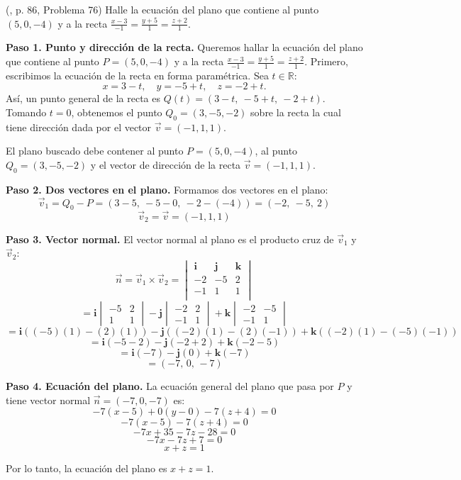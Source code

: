 \begin{prob} (\cite{espinoza2006Algebralineal}, p. 86, Problema 76) Halle la ecuación del plano que contiene al punto $(5,0,-4)$ y a la recta $\frac{x-3}{-1}=\frac{y+5}{1}=\frac{z+2}{1}$. 
\begin{myproof}
\textbf{Paso 1. Punto y dirección de la recta.} Queremos hallar la ecuación del plano que contiene al punto $P = (5,0,-4)$ y a la recta \(\frac{x-3}{-1} = \frac{y+5}{1} = \frac{z+2}{1}.\)
Primero, escribimos la ecuación de la recta en forma paramétrica. Sea $t \in \mathbb{R}$:
\[
x = 3 - t, \quad y = -5 + t, \quad z = -2 + t.
\]
Así, un punto general de la recta es $Q(t) = (3 - t,\ -5 + t,\ -2 + t)$.  
Tomando $t = 0$, obtenemos el punto $Q_0 = (3, -5, -2)$ sobre la recta la cual tiene dirección dada por el vector $\vec{v} = (-1,1,1)$.

El plano buscado debe contener al punto $P = (5,0,-4)$, al punto $Q_0 = (3,-5,-2)$ y el vector de dirección de la recta $\vec{v} = (-1,1,1)$.

\textbf{Paso 2. Dos vectores en el plano.} Formamos dos vectores en el plano:
\[
\vec{v}_1 = Q_0 - P = (3-5,\ -5-0,\ -2-(-4)) = (-2,\ -5,\ 2)
\]
\[
\vec{v}_2 = \vec{v} = (-1,1,1)
\]

\textbf{Paso 3. Vector normal.} El vector normal al plano es el producto cruz de $\vec{v}_1$ y $\vec{v}_2$:
\[
\vec{n} = \vec{v}_1 \times \vec{v}_2 = 
\begin{vmatrix}
\mathbf{i} & \mathbf{j} & \mathbf{k} \\
-2 & -5 & 2 \\
-1 & 1 & 1 \\
\end{vmatrix}
\]
\[
= \mathbf{i} \begin{vmatrix} -5 & 2 \\ 1 & 1 \end{vmatrix}
- \mathbf{j} \begin{vmatrix} -2 & 2 \\ -1 & 1 \end{vmatrix}
+ \mathbf{k} \begin{vmatrix} -2 & -5 \\ -1 & 1 \end{vmatrix}
\]
\[
= \mathbf{i}((-5)(1) - (2)(1)) - \mathbf{j}((-2)(1) - (2)(-1)) + \mathbf{k}((-2)(1) - (-5)(-1))
\]
\[
= \mathbf{i}(-5 - 2) - \mathbf{j}(-2 + 2) + \mathbf{k}(-2 - 5)
\]
\[
= \mathbf{i}(-7) - \mathbf{j}(0) + \mathbf{k}(-7)
\]
\[
= (-7,\, 0,\, -7)
\]

\textbf{Paso 4. Ecuación del plano.} La ecuación general del plano que pasa por $P$ y tiene vector normal $\vec{n} = (-7,0,-7)$ es:
\[
-7(x - 5) + 0(y - 0) - 7(z + 4) = 0
\]
\[
-7(x - 5) - 7(z + 4) = 0
\]
\[
-7x + 35 - 7z - 28 = 0
\]
\[
-7x - 7z + 7 = 0
\]
\[
x + z = 1
\]

Por lo tanto, la ecuación del plano es \(\boxed{x + z = 1}.\)
\end{myproof}

\end{prob}

